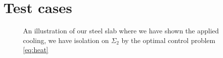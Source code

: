 \section{Test cases}
\begin{figure}
    \centering
    
    \caption{An illustration of our steel slab where we have shown the applied cooling, we have isolation on $\Sigma_2$ by the optimal control problem \eqref{eq:heat}}
    \label{fig:steel_slab}
\end{figure}